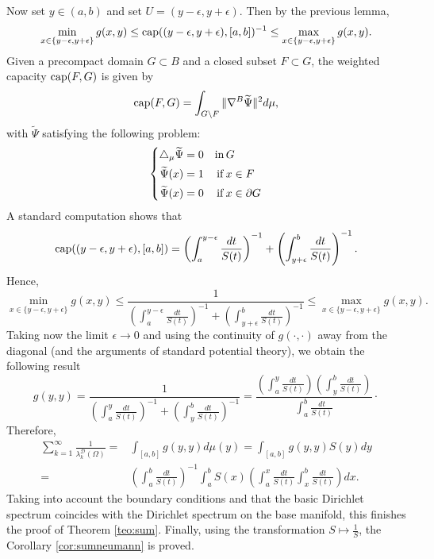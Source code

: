 \documentclass{amsart}
\theoremstyle{definition}
\theoremstyle{remark}
\numberwithin{equation}{section}
\begin{document}
Now set $y\in (a,b)$ and set $U=(y-\epsilon,y+\epsilon)$. Then by the previous lemma,
\[
\min_{x\in \{y-\epsilon,y+\epsilon\} } g(x,y)\leq {\rm cap}((y-\epsilon,y+\epsilon), [a,b])^{-1}\leq \max_{x\in \{y-\epsilon,y+\epsilon\} } g(x,y). 
\]
Given a precompact domain $G\subset B$ and a closed subset $F\subset G$, the weighted capacity ${\rm cap}(F,G)$ is given by
\[
{\rm cap}(F,G)=\int_{G\setminus F}\Vert \nabla^B \widetilde \Psi\Vert^2d\mu,
\]
with $\widetilde\Psi$ satisfying the following problem:
\begin{equation}\label{eq:1.6}
 \left\{
 \begin{aligned}
 \triangle_\mu\widetilde\Psi&=0& {\rm in }\, &G\\
 \widetilde\Psi(x)&=1& {\rm if }\, &x\in F\\
 \widetilde\Psi(x)&=0& {\rm if }\, &x\in \partial G
 \end{aligned}
 \right.
\end{equation}
A standard computation shows that
\[
 {\rm cap}((y-\epsilon,y+\epsilon), [a,b])=\left(\int_a^{y-\epsilon}\frac{dt}{S(t)}\right)^{-1}+\left(\int_{y+\epsilon}^b\frac{dt}{S(t)}\right)^{-1}.
\]
Hence,
\[
\min_{x\in \{y-\epsilon,y+\epsilon\} } g(x,y)\leq \frac{1}{\left( \displaystyle \int_a^{y-\epsilon}\frac{dt}{S(t)}\right)^{-1}+\left( \displaystyle\int_{y+\epsilon}^b\frac{dt}{S(t)}\right)^{-1}}\leq \max_{x\in \{y-\epsilon,y+\epsilon\} } g(x,y). 
\]
Taking now the limit $\epsilon\to 0$ and using the continuity of $g(\cdot,\cdot)$ away from the diagonal (and the arguments of standard potential theory), we obtain the following result
\begin{equation}\label{eq:3.2}
g(y,y)= \frac{1}{\left( \displaystyle \int_a^{y}\frac{dt}{S(t)}\right)^{-1}+\left( \displaystyle \int_{y}^b\frac{dt}{S(t)}\right)^{-1}}=\frac{\left(\displaystyle \int_a^{y}\frac{dt}{S(t)}\right)\left( \displaystyle\int_y^{b} \frac{dt}{S(t)}\right)}{\displaystyle\int_a^{b}\frac{dt}{S(t)}} \cdot 
\end{equation}
Therefore,
\begin{equation}\label{eq:basicespectrum}
\begin{aligned}
 \sum_{k=1}^{\infty}\frac{1}{\lambda_k^{\mathcal{D}}(\Omega)}=&\int_{[a,b]}g(y,y)d\mu(y)=\int_{[a,b]}g(y,y)S(y)dy \\
 =&\left( {\int_{a}^b\frac{dt}{S(t)}} \right)^{-1}\int_a^b S(x)\left(\int_a^x\frac{dt}{S(t)}\int_x^b\frac{dt}{S(t)}\right)dx.
\end{aligned}
\end{equation}
Taking into account the boundary conditions and that the basic Dirichlet spectrum coincides with the Dirichlet spectrum on the base manifold, this finishes the proof of Theorem \ref{teo:sum}. Finally, using the transformation $S\mapsto\frac{1}{S}$, the Corollary \ref{cor:sumneumann} is proved.
\end{document}

